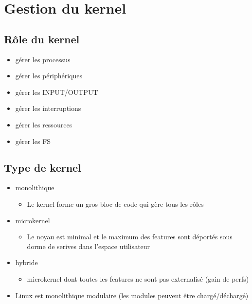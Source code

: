 \documentclass[a4paper]{article}
\begin{document}
      \section{Gestion du kernel}
      \subsection{Rôle du kernel}
      \begin{itemize}[label = \textbullet, font = \Large]
        \item gérer les processus
        \item gérer les périphériques
        \item gérer les INPUT/OUTPUT
        \item gérer les interruptions
        \item gérer les ressources
        \item gérer les FS
      \end{itemize}

      \subsection{Type de kernel}
      \begin{itemize}[label = \textbullet, font = \Large]
        \item monolithique
        \begin{itemize}[label=, font=\scriptsize] 
          \item Le kernel forme un gros bloc de code qui gère tous les rôles
        \end{itemize}
        \item microkernel
        \begin{itemize}[label=, font=\scriptsize] 
          \item Le noyau est minimal et le maximum des features sont déportés sous dorme de serives dans l'espace utilisateur
        \end{itemize}
        \item hybride
        \begin{itemize}[label=, font=\scriptsize] 
          \item microkernel dont toutes les features ne sont pas externalisé (gain de perfs)
        \end{itemize}
        \item Linux est monolithique modulaire (les modules peuvent être chargé/déchargé)
      \end{itemize}
\end{document}
